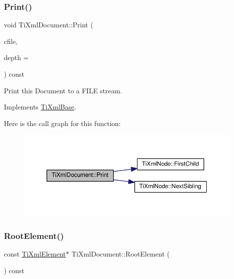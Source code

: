\subsubsection{\texorpdfstring{Print()}{Print()}\hspace{0.1cm}{\footnotesize\ttfamily [2/2]}}
{\footnotesize\ttfamily void Ti\+Xml\+Document\+::\+Print (\begin{DoxyParamCaption}\item[{F\+I\+LE $\ast$}]{cfile,  }\item[{int}]{depth = {} }\end{DoxyParamCaption}) const\hspace{0.3cm}{\ttfamily [virtual]}}



Print this Document to a F\+I\+LE stream. 



Implements \hyperlink{class_ti_xml_base_a0de56b3f2ef14c65091a3b916437b512}{Ti\+Xml\+Base}.

Here is the call graph for this function\+:
\nopagebreak
\begin{figure}[H]
\begin{center}
\leavevmode
\includegraphics[width=350pt]{class_ti_xml_document_aa9e166fae51da603641380a964f21eeb_cgraph}
\end{center}
\end{figure}
\mbox{\label{class_ti_xml_document_ab54e3a93279fcf0ac80f06ed9c52f04a}} 
\subsubsection{\texorpdfstring{Root\+Element()}{RootElement()}\hspace{0.1cm}{\footnotesize\ttfamily [1/2]}}
{\footnotesize\ttfamily const \hyperlink{class_ti_xml_element}{Ti\+Xml\+Element}$\ast$ Ti\+Xml\+Document\+::\+Root\+Element (\begin{DoxyParamCaption}{ }\end{DoxyParamCaption}) const\hspace{0.3cm}{\ttfamily [inline]}}

